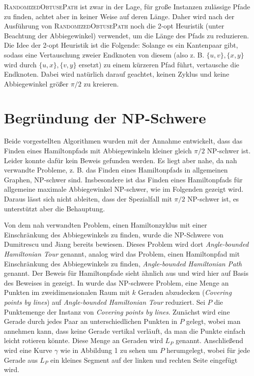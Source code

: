 \documentclass[a4paper, 10pt, ngerman]{article}
\begin{document}
\textsc{RandomizedObtusePath} ist zwar in der Lage, für große Instanzen zulässige Pfade zu finden, achtet aber in keiner Weise auf deren Länge. Daher wird nach der Ausführung von \textsc{RandomizedObtusePath} noch die 2-opt Heuristik (unter Beachtung der Abbiegewinkel) verwendet, um die Länge des Pfads zu reduzieren. Die Idee der 2-opt Heuristik ist die Folgende: Solange es ein Kantenpaar gibt, sodass eine Vertauschung zweier Endknoten von diesem (also z. B. $\{u, v\}, \{x, y\}$ wird durch $\{u, x\}, \{v, y\}$ ersetzt) zu einem kürzeren Pfad führt, vertausche die Endknoten. Dabei wird natürlich darauf geachtet, keinen Zyklus und keine Abbiegewinkel größer $\pi / 2$ zu kreieren.

\section{Begründung der NP-Schwere}

Beide vorgestellten Algorithmen wurden mit der Annahme entwickelt, dass das Finden eines Hamiltonpfads mit Abbiegewinkeln kleiner gleich $\pi / 2$ NP-schwer ist. Leider konnte dafür kein Beweis gefunden werden. Es liegt aber nahe, da nah verwandte Probleme, z. B. das Finden eines Hamiltonpfads in allgemeinen Graphen, NP-schwer sind. Insbesondere ist das Finden eines Hamiltonpfads für allgemeine maximale Abbiegewinkel NP-schwer, wie im Folgenden gezeigt wird. Daraus lässt sich nicht ableiten, dass der Spezialfall mit $\pi / 2$ NP-schwer ist, es unterstützt aber die Behauptung.

Von dem nah verwandten Problem, einen Hamiltonzyklus mit einer Einschränkung des  Abbiegewinkels zu finden, wurde die NP-Schwere von Dumitrescu und Jiang \cite{nphard} bereits bewiesen. Dieses Problem wird dort \emph{Angle-bounded Hamiltonian Tour} genannt, analog wird das Problem, einen Hamiltonpfad mit Einschränkung des Abbiegewinkels zu finden, \emph{Angle-bounded Hamiltonian Path} genannt. Der Beweis für Hamiltonpfade sieht ähnlich aus und wird hier auf Basis des Beweises in \cite{nphard} gezeigt. In \cite{nphard} wurde das NP-schwere Problem, eine Menge an Punkten im zweidimensionalen Raum mit $k$ Geraden abzudecken (\emph{Covering points by lines}) auf \emph{Angle-bounded Hamiltonian Tour} reduziert. Sei $P$ die Punktemenge der Instanz von \emph{Covering points by lines}. Zunächst wird eine Gerade durch jedes Paar an unterschiedlichen Punkten in $P$ gelegt, wobei man annehmen kann, dass keine Gerade vertikal verläuft, da man die Punkte einfach leicht rotieren könnte. Diese Menge an Geraden wird $L_P$ genannt. Anschließend wird eine Kurve $\gamma$ wie in Abbildung 1 zu sehen um $P$ herumgelegt, wobei für jede Gerade aus $L_P$ ein kleines Segment auf der linken und rechten Seite eingefügt wird.
\end{document}
